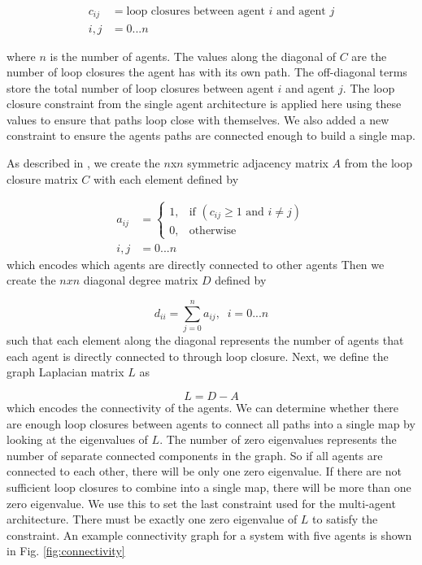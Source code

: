 \documentclass[letterpaper, 10 pt, conference]{ieeeconf}  %
\begin{document}
\begin{align}
  c_{ij} &= \text{loop closures between agent } i \text{ and agent } j \\
  i,j &= 0...n \nonumber
\end{align}

where $n$ is the number of agents. The values along the diagonal of $C$ are the number of loop closures the agent has with its own path. The off-diagonal terms store the total number of loop closures between agent $i$ and agent $j$. The loop closure constraint from the single agent architecture is applied here using these values to ensure that paths loop close with themselves. We also added a new constraint to ensure the agents paths are connected enough to build a single map.

As described in \cite{Weisstein}, we create the $n$x$n$ symmetric adjacency matrix $A$ from the loop closure matrix $C$ with each element defined by

\begin{align}
  a_{ij} &=
  \begin{cases}
    1, & \text{if } (c_{ij} \geq 1 \text{ and } i \neq j)\\
    0, & \text{otherwise}
  \end{cases}\\
  i,j &=0 ...n \nonumber
\end{align}
%
which encodes which agents are directly connected to other agents
Then we create the $nxn$ diagonal degree matrix $D$ defined by

\begin{equation}
  d_{ii} = \sum_{j=0}^{n} a_{ij},\;\; i = 0 ... n \nonumber
\end{equation}
%
such that each element along the diagonal represents the number of agents that each agent is directly connected to through loop closure. Next, we define the graph Laplacian matrix $L$ as

\begin{equation}
  L = D-A
\end{equation}
%
which encodes the connectivity of the agents. We can determine whether there are enough loop closures between agents to connect all paths into a single map by looking at the eigenvalues of $L$. The number of zero eigenvalues represents the number of separate connected components in the graph. So if all agents are connected to each other, there will be only one zero eigenvalue. If there are not sufficient loop closures to combine into a single map, there will be more than one zero eigenvalue. We use this to set the last constraint used for the multi-agent architecture. There must be exactly one zero eigenvalue of $L$ to satisfy the constraint. An example connectivity graph for a system with five agents is shown in Fig. \ref{fig:connectivity}
\end{document}

